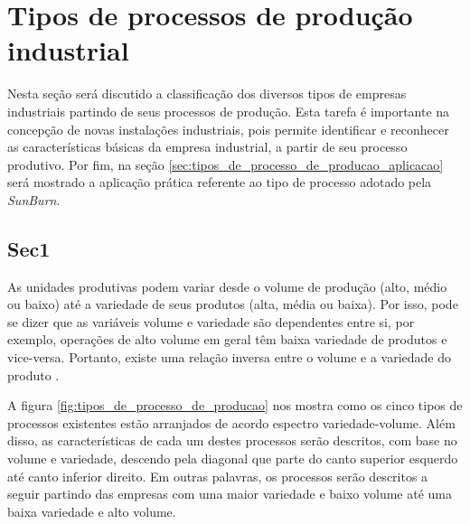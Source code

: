 \chapter{Tipos de processos de produção industrial}
\label{chap:tipos_de_processo_de_producao}

Nesta seção será discutido a classificação dos diversos tipos de empresas industriais partindo de seus processos de produção. Esta tarefa é importante na concepção de novas instalações industriais, pois permite identificar e reconhecer as características básicas da empresa industrial, a partir de seu processo produtivo. Por fim, na seção \ref{sec:tipos_de_processo_de_producao_aplicacao} será mostrado a aplicação prática referente ao tipo de processo adotado pela \textit{SunBurn}.

\section{Sec1}
\label{sec:tipos_de_processo_de_producao_sec1}

As unidades produtivas podem variar desde o volume de produção (alto, médio ou baixo) até a variedade de seus produtos (alta, média ou baixa). Por isso, pode se dizer que as variáveis volume e variedade são dependentes entre si, por exemplo, operações de alto volume em geral têm baixa variedade de produtos e vice-versa. Portanto, existe uma relação inversa entre o volume e a variedade do produto \cite{slack2009administracao}.

A figura \ref{fig:tipos_de_processo_de_producao} nos mostra como os cinco tipos de processos existentes estão arranjados de acordo espectro variedade-volume. Além disso, as características de cada um destes processos serão descritos, com base no volume e variedade, descendo pela diagonal que parte do canto superior esquerdo até canto inferior direito. Em outras palavras, os processos serão descritos a seguir partindo das empresas com uma maior variedade e baixo volume até uma baixa variedade e alto volume.

